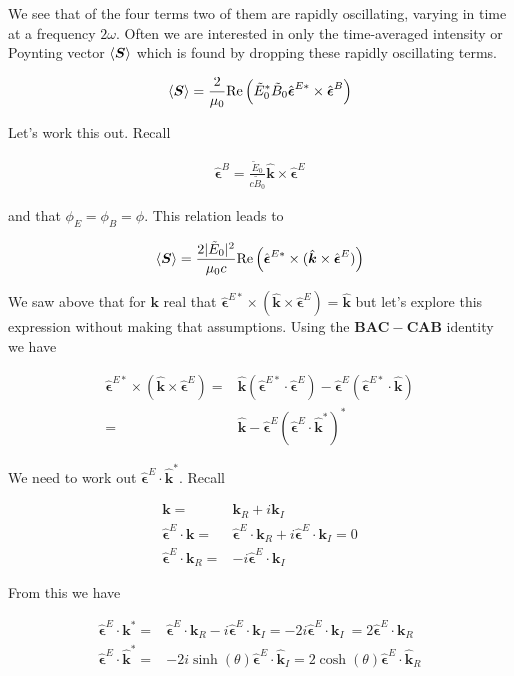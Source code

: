 \documentclass[12pt]{article}
\newcommand{\ep}{\epsilon}
\renewcommand{\vec}[1]{\boldsymbol{#1}}
\newcommand{\unitvec}[1]{\hat{\boldsymbol{#1}}}
\begin{document}
We see that of the four terms two of them are rapidly oscillating, varying in time at a frequency $2\omega$.
Often we are interested in only the time-averaged intensity or Poynting vector $\Braket{\vec{S}}$ which is found by dropping these rapidly oscillating terms.

\begin{align}
\Braket{\vec{S}} = \frac{2}{\mu_0}\text{Re}\left(\tilde{E}_0^*\tilde{B}_0 \unitvec{\ep}^{E*}\times \unitvec{\ep}^B\right)
\end{align}

Let's work this out. 
Recall

\begin{align}
\unitvec{\ep}^B = \frac{\tilde{E}_0}{c\tilde{B}_0} \unitvec{k}\times\unitvec{\ep}^E
\end{align}

and that $\phi_E=\phi_B=\phi$.
This relation leads to

\begin{align}
\Braket{\vec{S}} = \frac{2|\tilde{E}_0|^2}{\mu_0 c} \text{Re}\left(\unitvec{\ep}^{E*}\times (\unitvec{k}\times \unitvec{\ep}^E)\right)
\end{align}

We saw above that for $\vec{k}$ real that $\unitvec{\ep}^{E*}\times (\unitvec{k}\times \unitvec{\ep}^E) = \unitvec{k}$ but let's explore this expression without making that assumptions.
Using the $\vec{BAC}-\vec{CAB}$ identity we have

\begin{align}
\unitvec{\ep}^{E*}\times (\unitvec{k}\times \unitvec{\ep}^E) =& \unitvec{k}(\unitvec{\ep}^{E*}\cdot\unitvec{\ep}^E) - \unitvec{\ep}^E(\unitvec{\ep}^{E*}\cdot \unitvec{k})\\
=& \unitvec{k} - \unitvec{\ep}^E\left(\unitvec{\ep}^E\cdot \unitvec{k}^*\right)^*
\end{align}

We need to work out $\unitvec{\ep}^E\cdot\unitvec{k}^*$.
Recall

\begin{align}
\vec{k} =& \vec{k}_R + i \vec{k}_I\\
\unitvec{\ep}^E\cdot\vec{k} =& \unitvec{\ep}^E\cdot \vec{k}_R + i \unitvec{\ep}^E\cdot\vec{k}_I = 0\\
\unitvec{\ep}^E\cdot\vec{k}_R =& -i\unitvec{\ep}^E\cdot\vec{k}_I
\end{align}

From this we have

\begin{align}
\unitvec{\ep}^E\cdot\vec{k}^* =& \unitvec{\ep}^E\cdot \vec{k}_R - i \unitvec{\ep}^E\cdot\vec{k}_I = -2i\unitvec{\ep}^E \cdot \vec{k}_I\ = 2\unitvec{\ep}^E\cdot\vec{k}_R\\
\unitvec{\ep}^E \cdot \unitvec{k}^* =& -2i \sinh(\theta) \unitvec{\ep}^E \cdot \unitvec{k}_I = 2\cosh(\theta)\unitvec{\ep}^E\cdot\unitvec{k}_R
\end{align}
\end{document}

